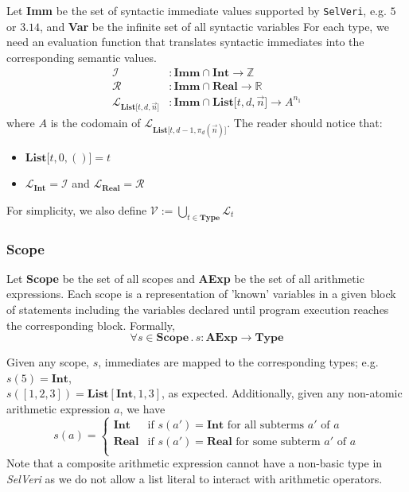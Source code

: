 \documentclass{article}
\begin{document}
Let \textbf{Imm} be the set of syntactic immediate values supported by \texttt{SelVeri}, e.g. $5$ or  $3.14$, and \textbf{Var} be the infinite set of all syntactic variables  For each type, we need an evaluation function that translates syntactic immediates into the corresponding semantic values.
\begin{align*}
\mathcal{I}&: \textbf{Imm} \cap \textbf{Int} \rightarrow \mathbb{Z} \\
\mathcal{R}&: \textbf{Imm} \cap \textbf{Real} \rightarrow \mathbb{R} \\
\mathcal{L}_{\textbf{List[$t, d, \vec{n}$]}}&: \textbf{Imm} \cap \textbf{List[$t, d, \vec{n}$]} \rightarrow A^{n_1} 
\end{align*}
where $A$ is the codomain of $\mathcal{L}_{\textbf{List[$t, d-1, \pi_d(\vec{n})$]}}$. The reader should notice that:
\begin{itemize}
    \item $\textbf{List[$t, 0, ()$]} = t$ 
    \item $\mathcal{L}_\textbf{Int} = \mathcal{I}$ and $\mathcal{L}_\textbf{Real} = \mathcal{R}$
\end{itemize}
For simplicity, we also define $\mathcal{V} := \bigcup_{t \in \textbf{Type}} \mathcal{L}_t$

\subsubsection{Scope}

Let \textbf{Scope} be the set of all scopes and \textbf{AExp} be the set of all arithmetic expressions. Each scope is a representation  of 'known' variables in a given block of statements including the variables declared until program execution reaches the corresponding block. Formally,
\[
\forall s \in \textbf{Scope} \, . \, s: \textbf{AExp}  \rightarrow \textbf{Type}
\]

Given any scope, $s$, immediates are mapped to the corresponding types; e.g. $s(5) = \textbf{Int}$,\\ $s([1,2,3]) = \textbf{List}[\textbf{Int}, 1, 3]$, as expected. Additionally, given any non-atomic arithmetic expression $a$, we have
\[
s(a) = \begin{cases}
\textbf{Int} & \text{if $s(a') = \textbf{Int}$ for all subterms $a'$ of $a$} \\
\textbf{Real} & \text{if $s(a') = \textbf{Real}$ for some subterm $a'$ of $a$} \\ 
\end{cases}
\] 
Note that a composite arithmetic expression cannot have a non-basic type in \textit{SelVeri} as
we do not allow a list literal to interact with arithmetic operators.
\end{document}
